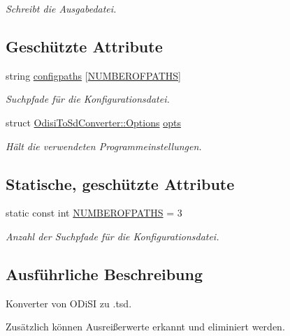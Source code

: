 \begin{DoxyCompactItemize}
\begin{DoxyCompactList}\small\item\em Schreibt die Ausgabedatei. \end{DoxyCompactList}\end{DoxyCompactItemize}
\subsection*{Geschützte Attribute}
\begin{DoxyCompactItemize}
\item 
string \hyperlink{classOdisiToSdConverter_aeecf67d22a4b6333ceabe5f1a1036736}{configpaths} \mbox{[}\hyperlink{classOdisiToSdConverter_a6f59f3670356c1588b736af33d59532a}{N\-U\-M\-B\-E\-R\-O\-F\-P\-A\-T\-H\-S}\mbox{]}
\begin{DoxyCompactList}\small\item\em Suchpfade für die Konfigurationsdatei. \end{DoxyCompactList}\item 
struct \hyperlink{structOdisiToSdConverter_1_1Options}{Odisi\-To\-Sd\-Converter\-::\-Options} \hyperlink{classOdisiToSdConverter_a032865606668d520887b2b164913539d}{opts}
\begin{DoxyCompactList}\small\item\em Hält die verwendeten Programmeinstellungen. \end{DoxyCompactList}\end{DoxyCompactItemize}
\subsection*{Statische, geschützte Attribute}
\begin{DoxyCompactItemize}
\item 
static const int \hyperlink{classOdisiToSdConverter_a6f59f3670356c1588b736af33d59532a}{N\-U\-M\-B\-E\-R\-O\-F\-P\-A\-T\-H\-S} = 3
\begin{DoxyCompactList}\small\item\em Anzahl der Suchpfade für die Konfigurationsdatei. \end{DoxyCompactList}\end{DoxyCompactItemize}


\subsection{Ausführliche Beschreibung}
Konverter von O\-Di\-S\-I zu .tsd. 

Zusätzlich können Ausreißerwerte erkannt und eliminiert werden. 

